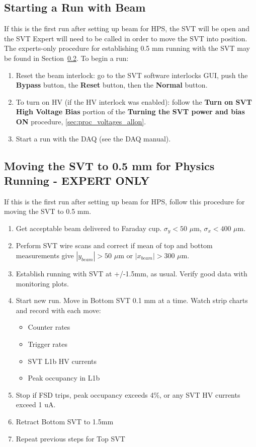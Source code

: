 \documentclass[12pt]{report}
\begin{document}
\subsection{Starting a Run with Beam}
\label{sec:proc_general_startrun}
If this is the first run after setting up beam for HPS, the SVT will be open and the SVT Expert will need to be called in order to move the SVT into position. The experts-only procedure for establishing 0.5 mm running with the SVT may be found in Section~\ref{sec:proc_svt_0.5mm}.  To begin a run:
\begin{enumerate}
\item Reset the beam interlock: go to the SVT software interlocks GUI, push the \textbf{Bypass} button, the \textbf{Reset} button, then the \textbf{Normal} button.
\item To turn on HV (if the HV interlock was enabled): follow the \textbf{Turn on SVT High Voltage Bias} portion of the \textbf{Turning the SVT power and bias ON} procedure, \ref{sec:proc_voltages_allon}.
\item Start a run with the DAQ (see the DAQ manual).
\end{enumerate}

\subsection{Moving the SVT to 0.5 mm for Physics Running - \textbf{EXPERT ONLY}}
\label{sec:proc_svt_0.5mm}

If this is the first run after setting up beam for HPS, follow this procedure for moving the SVT to 0.5 mm.
\begin{enumerate}
\item Get acceptable beam delivered to Faraday cup.  $\sigma_y < 50$ $\mu$m, $\sigma_x < 400$ $\mu$m.
\item Perform SVT wire scans and correct if mean of top and bottom measurements give $|y_{beam}| > 50$ $\mu$m or $|x_{beam}| > 300$ $\mu$m. 
\item Establish running with SVT at +/-1.5mm, as usual.  Verify good data with monitoring plots.
\item Start new run.  Move in Bottom SVT 0.1 mm at a time.  Watch strip charts and record with each move:
\begin{itemize}
\item	Counter rates
\item Trigger rates
\item SVT L1b HV currents
\item Peak occupancy in L1b
\end{itemize}
\item Stop if FSD trips, peak occupancy exceeds 4\%, or any SVT HV currents exceed 1 uA.
\item Retract Bottom SVT to 1.5mm
\item Repeat previous steps for Top SVT
\end{enumerate}
\end{document}
